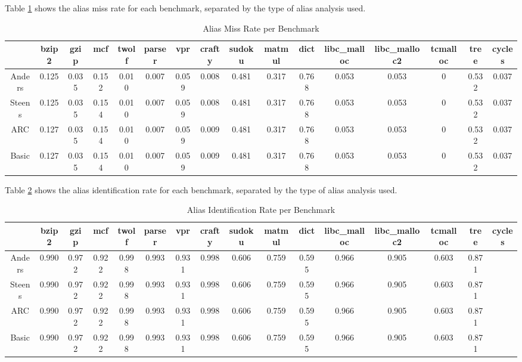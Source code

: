 Table \ref{table:3} shows the alias miss rate for each benchmark, separated by the type of alias analysis used.

\begin{table}
\centering
   \begin{tabular} {|c|c c c c c c c c c c c c c c c|}
      \hline
      & bzip2 & gzip & mcf & twolf & parser & vpr & crafty & sudoku & matmul & dict & libc_malloc & libc_malloc2 & tcmalloc & tree & cycles \\
      \hline
      Anders & 0.125 & 0.035 & 0.152 & 0.010 & 0.007 & 0.059 & 0.008 & 0.481 & 0.317 & 0.768 & 0.053 & 0.053 & 0 & 0.532 & 0.037 \\
      \hline
      Steens & 0.125 & 0.035 & 0.154 & 0.010 & 0.007 & 0.059 & 0.008 & 0.481 & 0.317 & 0.768 & 0.053 & 0.053 & 0 & 0.532 & 0.037 \\
      \hline
      ARC & 0.127 & 0.035 & 0.154 & 0.010 & 0.007 & 0.059 & 0.009 & 0.481 & 0.317 & 0.768 & 0.053 & 0.053 & 0 & 0.532 & 0.037 \\
      \hline
      Basic & 0.127 & 0.035 & 0.154 & 0.010 & 0.007 & 0.059 & 0.009 & 0.481 & 0.317 & 0.768 & 0.053 & 0.053 & 0 & 0.532 & 0.037 \\
      \hline
   \end{tabular}
   \caption{Alias Miss Rate per Benchmark}
   \label{table:3}
\end{table}

Table \ref{table:4} shows the alias identification rate for each benchmark, separated by the type of alias analysis used.

\begin{table}
\centering
   \begin{tabular} {|c|c c c c c c c c c c c c c c c|}
      \hline
      & bzip2 & gzip & mcf & twolf & parser & vpr & crafty & sudoku & matmul & dict & libc_malloc & libc_malloc2 & tcmalloc & tree & cycles \\
      \hline
      Anders & 0.990 & 0.972 & 0.922 & 0.998 & 0.993 & 0.931 & 0.998 & 0.606 & 0.759 & 0.595 & 0.966 & 0.905 & 0.603 & 0.871 \\
      \hline
      Steens & 0.990 & 0.972 & 0.922 & 0.998 & 0.993 & 0.931 & 0.998 & 0.606 & 0.759 & 0.595 & 0.966 & 0.905 & 0.603 & 0.871 \\
      \hline
      ARC & 0.990 & 0.972 & 0.922 & 0.998 & 0.993 & 0.931 & 0.998 & 0.606 & 0.759 & 0.595 & 0.966 & 0.905 & 0.603 & 0.871 \\
      \hline
      Basic & 0.990 & 0.972 & 0.922 & 0.998 & 0.993 & 0.931 & 0.998 & 0.606 & 0.759 & 0.595 & 0.966 & 0.905 & 0.603 & 0.871 \\
      \hline
   \end{tabular}
   \caption{Alias Identification Rate per Benchmark}
   \label{table:4}
\end{table}

